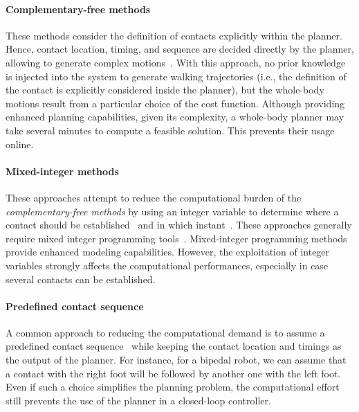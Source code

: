 \paragraph{Complementary-free methods}
These methods consider the definition of contacts explicitly within the planner. Hence, contact location,
timing, and sequence are decided directly by the planner, allowing
to generate complex motions~\citep{Dafarra2020Whole-BodyApproach,Dafarra2022DynamicLocomotion,dai2014whole}.
With this approach, no prior knowledge is injected into the system to generate walking trajectories
(i.e., the definition of the contact is explicitly considered inside the planner),
but the whole-body motions result from a particular choice of the cost function.
Although providing enhanced planning capabilities, given its complexity, a whole-body planner may
take several minutes to compute a feasible solution. This prevents their usage online.

\paragraph{Mixed-integer methods}
These approaches attempt to reduce the computational burden of the \emph{complementary-free methods} by using an integer variable to determine where a contact should be established~\citep{Deits2015,Mason2018} and in
which instant~\citep{Ibanez2014EmergenceControl,Aceituno-Cabezas2018}. These approaches generally require mixed integer programming tools~\citep{GurobiOptimization2022GurobiManual,Stellato2018EmbeddedSolver,Axehill2006AMPC}. Mixed-integer programming methods provide enhanced modeling capabilities. However, the exploitation of integer variables strongly affects the computational performances, especially in case several contacts can be established.

\paragraph{Predefined contact sequence}
A common approach to reducing the computational demand is to assume a predefined contact
sequence~\citep{Caron2017,carpentier2016versatile,Winkler2018GaitParameterization} while keeping the
contact location and timings as the output of the planner. For instance, for a bipedal robot, we can
assume that a contact with the right foot will be followed by another one with the left foot.
Even if such a choice simplifies the planning problem, the computational effort still prevents the use of the planner in a closed-loop controller.

